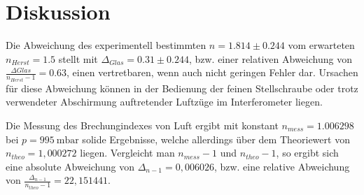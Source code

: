 \section{Diskussion}
Die Abweichung des experimentell bestimmten $n =1.814 \pm 0.244$ vom erwarteten $n_{Herst} = 1.5$ stellt mit $\Delta_{Glas} = 0.31 \pm 0.244$, bzw. einer relativen Abweichung von $\frac{\Delta{Glas}}{n_{Herst}-1} = 0.63$, einen vertretbaren, wenn auch nicht geringen Fehler dar. Ursachen für diese Abweichung können in der Bedienung der feinen Stellschraube oder trotz verwendeter Abschirmung auftretender Luftzüge im Interferometer liegen.

Die Messung des Brechungindexes von Luft ergibt mit konstant $n_{mess}=1.006298$ bei $p=\SI{995}{\milli\bar}$ solide Ergebnisse, welche allerdings über dem Theoriewert von $n_{theo}=1,000272$ \cite{Luftdruck} liegen. Vergleicht man $n_{mess}-1$ und $n_{theo}-1$, so ergibt sich eine absolute Abweichung von $\Delta_{n-1} = 0,006026$, bzw. eine relative Abweichung von $\frac{\Delta_{n-1}}{n_{theo}-1}=22,151441$.
